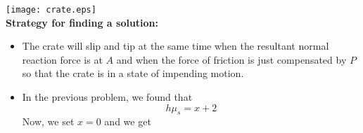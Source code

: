 \documentclass{seminar}
\begin{document}
\begin{slide}
\texttt{[image: crate.eps]}\\
{\bf\blue Strategy for finding a solution:}
\begin{itemize}
\item{}The crate will slip and tip at the same time when the resultant
normal reaction force is at $A$ and when the force of friction is just
compensated by $P$ so that the crate is in a state of impending motion.
\item{}In the previous problem, we found that
$$
h\mu_s=x+2
$$
Now, we set $x=0$ and we get 
\end{itemize}
\vfill
\end{slide}









\end{document}
